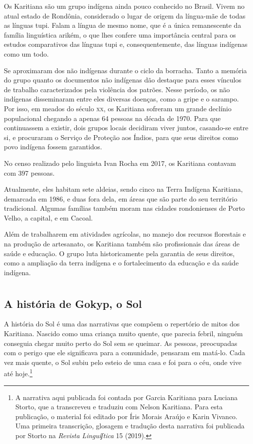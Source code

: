 Os Karitiana são um grupo indígena ainda pouco conhecido no Brasil. Vivem no atual estado de Rondônia, considerado o lugar de origem da
língua-mãe de todas as línguas tupi. Falam a língua de
mesmo nome, que é a única remanescente da família linguística arikém, o
que lhes confere uma importância central para os estudos comparativos
das línguas tupi e, consequentemente, das línguas indígenas como um
todo.

Se aproximaram dos não indígenas durante o ciclo da
borracha. Tanto a memória do grupo quanto os documentos não indígenas dão
destaque para esses vínculos de trabalho caracterizados pela violência
dos patrões. Nesse período, os não indígenas disseminaram entre eles
diversas doenças, como a gripe e o sarampo. Por isso, em meados do
século \textsc{xx}, os Karitiana sofreram um grande declínio populacional 
chegando a apenas 64 pessoas na década de 1970. Para que continuassem a
existir, dois grupos locais decidiram viver juntos, casando-se entre si,
e procuraram o Serviço de Proteção aos Índios, para que seus direitos
como povo indígena fossem garantidos.

No censo realizado pelo linguista Ivan Rocha em 2017, os Karitiana
contavam com 397 pessoas.

Atualmente, eles habitam sete aldeias, sendo cinco na Terra Indígena
Karitiana, demarcada em 1986, e duas fora dela, em áreas que são parte
do seu território tradicional. Algumas famílias também moram nas cidades
rondonienses de Porto Velho, a capital, e em Cacoal.

Além de trabalharem em atividades agrícolas, no manejo dos recursos
florestais e na produção de artesanato, os Karitiana também são
profissionais das áreas de saúde e educação. O grupo luta historicamente
pela garantia de seus direitos, como a ampliação da terra indígena e o
fortalecimento da educação e da saúde indígena.

\chapter{}

\section{A história de Gokyp, o Sol} A história do Sol é uma das narrativas que compõem o repertório de mitos dos Karitiana. Nascido como uma criança muito quente, que parecia febril, ninguém conseguia chegar muito perto do Sol sem se queimar. As
pessoas, preocupadas com o perigo que ele significava para a comunidade,
pensaram em matá-lo. Cada vez mais quente, o Sol subiu pelo esteio de
uma casa e foi para o céu, onde vive até hoje.\footnote{A narrativa aqui publicada foi contada por Garcia Karitiana para Luciana Storto, que a transcreveu e traduziu com Nelson Karitiana. Para esta
publicação, o material foi editado por Íris Morais Araújo e Karin
Vivanco. Uma primeira transcrição, glosagem e tradução desta narrativa foi publicada por Storto na \textit{Revista Linguíʃtica} 15 (2019).}


